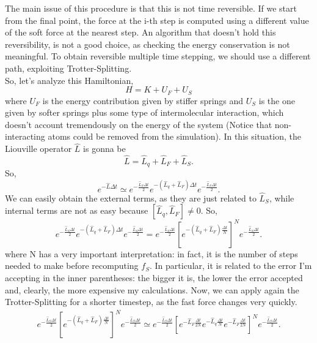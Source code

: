 The main issue of this procedure is that this is not time reversible. If we start from the final point, the force at the i-th step is computed using a different value of the soft force at the nearest step. An algorithm that doesn't hold this reversibility, is not a good choice, as checking the energy conservation is not meaningful. To obtain reversible multiple time stepping, we should use a different path, exploiting Trotter-Splitting.\\
So, let's analyze this Hamiltonian,
\begin{equation}
    H = K + U_F + U_S
\end{equation}
where $U_F$ is the energy contribution given by stiffer springs and $U_S$ is the one given by softer springs plus some type of intermolecular interaction, which doesn't account tremendously on the energy of the system (Notice that non-interacting atoms could be removed from the simulation). In this situation, the Liouville operator $\widehat{L}$ is gonna be
\begin{equation*}
    \hat{L} = \hat{L}_q + \hat{L}_F + \hat{L}_S.
\end{equation*}
So,
\begin{equation}
    e^{-\hat{L}\Delta t} \simeq e^{-\frac{\hat{L}_S\Delta t}{2}} e^{-(\hat{L}_q + \hat{L}_F)\Delta t} e^{-\frac{\hat{L}_S\Delta t}{2}}.
\end{equation}
We can easily obtain the external terms, as they are just related to $\hat{L}_S$, while internal terms are not as easy because $[\hat{L}_q,\hat{L}_F] \neq 0$. So,
\begin{equation}
e^{-\frac{\hat{L}_S\Delta t}{2}} e^{-(\hat{L}_q + \hat{L}_F)\Delta t} e^{-\frac{\hat{L}_S\Delta t}{2}} = e^{-\frac{\hat{L}_S\Delta t}{2}} [e^{-(\hat{L}_q + \hat{L}_F)\frac{\Delta t}{N}}]^{N} e^{-\frac{\hat{L}_S\Delta t}{2}}.
\end{equation}
where N has a very important interpretation: in fact, it is the number of steps needed to make before recomputing $f_S$. In particular, it is related to the error I'm accepting in the inner parentheses: the bigger it is, the lower the error accepted and, clearly, the more expensive my calculations. Now, we can apply again the Trotter-Splitting for a shorter timestep, as the fast force changes very quickly.
\begin{align}
 e^{-\frac{\hat{L}_S\Delta t}{2}} [e^{-(\hat{L}_q + \hat{L}_F)\frac{\Delta t}{N}}]^{N} e^{-\frac{\hat{L}_S\Delta t}{2}} \simeq  e^{-\frac{\hat{L}_S\Delta t}{2}} [e^{-\hat{L}_F\frac{\Delta t}{2N}} e^{-\hat{L}_q\frac{\Delta t}{N}} e^{-\hat{L}_F\frac{\Delta t}{2N}}]^{N} e^{-\frac{\hat{L}_S\Delta t}{2}}.
\end{align}
